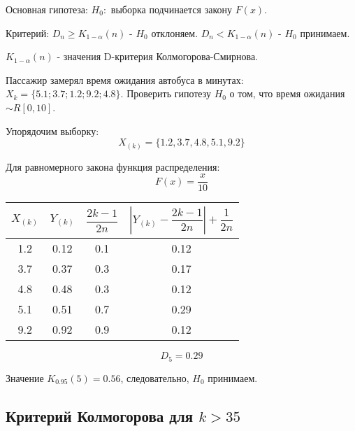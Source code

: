 Основная гипотеза: $H_0:$ выборка подчинается закону $F(x)$.

Критерий: $D_n \geqslant K_{1-\alpha} (n)$ - $H_0$ отклоняем.
  $D_n < K_{1-\alpha} (n)$ - $H_0$ принимаем. 

$K_{1-\alpha} (n)$ - значения D-критерия Колмогорова-Смирнова.

\begin{ex}
  Пассажир замерял время ожидания автобуса в минутах: $X_k = \{ 5.1; 3.7; 1.2; 9.2; 4.8 \}$.
  Проверить гипотезу $H_0$ о том, что время ожидания $\sim R[0, 10]$.
 
  Упорядочим выборку:
  \[
    X_{(k)} = \{ 1.2, 3.7, 4.8, 5.1, 9.2 \}
  \]

  Для равномерного закона функция распределения:
  \[
    F(x) = \dfrac{x}{10}
  \]

  \begin{center}
    \begin{tabular}{|c|c|c|c|}
      \hline
      $X_{(k)}$ & $Y_{(k)}$ & $\dfrac{2k-1}{2n}$ & $\left| Y_{(k)} - \dfrac{2k-1}{2n} \right| + \dfrac{1}{2n}$ \\
      \hline
      1.2 & 0.12 & 0.1 & 0.12 \\
      3.7 & 0.37 & 0.3 & 0.17 \\
      4.8 & 0.48 & 0.3 & 0.12 \\
      5.1 & 0.51 & 0.7 & 0.29 \\
      9.2 & 0.92 & 0.9 & 0.12 \\
      \hline
    \end{tabular}
  \end{center}

  \[
    D_5 = 0.29
  \]

  Значение $K_{0.95} (5) = 0.56$, следовательно, $H_0$ принимаем.
\end{ex}

\subsection{Критерий Колмогорова для $k>35$}

